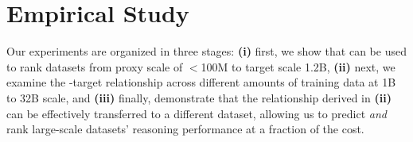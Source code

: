 



\section{Empirical Study}\label{sec:exp}

Our experiments are organized in three stages: \textbf{(i)} first, we show that  can be used to rank datasets from proxy scale of $<$100M to target scale 1.2B, \textbf{(ii)} next, we examine the -target relationship across different amounts of training data at 1B to 32B scale, and \textbf{(iii)} finally, demonstrate that the relationship derived in \textbf{(ii)} can be effectively transferred to a different dataset, allowing us to predict \textit{and} rank large-scale datasets' reasoning performance at a fraction of the cost. 

